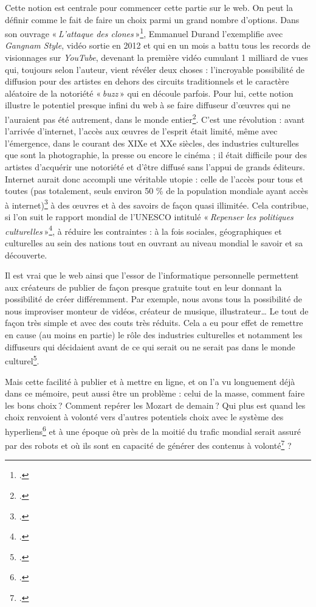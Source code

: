 Cette notion est centrale pour commencer cette partie sur le web. On peut la définir comme le fait de faire un choix parmi un grand nombre d’options. Dans son ouvrage « \textit{L’attaque des clones} »\footcite{durand2016}, Emmanuel Durand l’exemplifie avec \textit{Gangnam Style}, vidéo sortie en 2012 et qui en un mois a battu tous les records de visionnages sur \textit{YouTube}, devenant la première vidéo cumulant 1 milliard de vues qui, toujours selon l’auteur, vient révéler deux choses : l’incroyable possibilité de diffusion pour des artistes en dehors des circuits traditionnels et le caractère aléatoire de la notoriété « \textit{buzz} » qui en découle parfois. Pour lui, cette notion illustre le potentiel presque infini du web à se faire diffuseur d’œuvres qui ne l’auraient pas été autrement, dans le monde entier\footcite[§ 1 et § 4]{durand_chapitre_2016}. C’est une révolution : avant l’arrivée d’internet, l’accès aux œuvres de l’esprit était limité, même avec l’émergence, dans le courant des XIXe et XXe siècles, des industries culturelles que sont la photographie, la presse ou encore le cinéma ; il était difficile pour des artistes d’acquérir une notoriété et d’être diffusé sans l’appui de grands éditeurs. Internet aurait donc accompli une véritable utopie : celle de l’accès pour tous et toutes (pas totalement, seuls environ 50 \% de la population mondiale ayant accès à internet)\footcite{2024h} à des œuvres et à des savoirs de façon quasi illimitée. Cela contribue, si l’on suit le rapport mondial de l’UNESCO intitulé « \textit{Repenser les politiques culturelles} »\footcite[cité dans Durand Emmanuel, \textit{l'attaque des clones}... § 10]{zotero-651}, à réduire les contraintes : à la fois sociales, géographiques et culturelles au sein des nations tout en ouvrant au niveau mondial le savoir et sa découverte.

Il est vrai que le web ainsi que l’essor de l’informatique personnelle permettent aux créateurs de publier de façon presque gratuite tout en leur donnant la possibilité de créer différemment. Par exemple, nous avons tous la possibilité de nous improviser monteur de vidéos, créateur de musique, illustrateur… Le tout de façon très simple et avec des couts très réduits. Cela a eu pour effet de remettre en cause (au moins en partie) le rôle des industries culturelles et notamment les diffuseurs qui décidaient avant de ce qui serait ou ne serait pas dans le monde culturel\footcite[§ 19]{durand_chapitre_2016}.

Mais cette facilité à publier et à mettre en ligne, et on l’a vu longuement déjà dans ce mémoire, peut aussi être un problème : celui de la masse, comment faire les bons choix ? Comment repérer les Mozart de demain ? Qui plus est quand les choix renvoient à volonté vers d’autres potentiels choix avec le système des hyperliens\footcite{noauthor_hyperchoix_nodate} et à une époque où près de la moitié du trafic mondial serait assuré par des robots et où ils sont en capacité de générer des contenus à volonté\footcite{ertzscheid2023} ?

